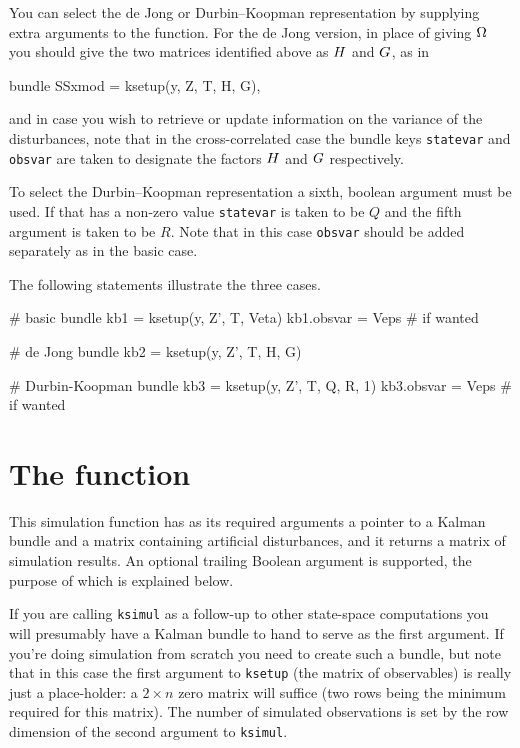 You can select the de Jong or Durbin--Koopman representation by
supplying extra arguments to the  function. For the de
Jong version, in place of giving $\Omega$ you should give the two
matrices identified above as $H$ and $G$, as in
\begin{code}
bundle SSxmod = ksetup(y, Z, T, H, G),
\end{code}
and in case you wish to retrieve or update information on the variance of
the disturbances, note that in the cross-correlated case the bundle
keys \texttt{statevar} and \texttt{obsvar} are taken to designate the
factors $H$ and $G$ respectively.

To select the Durbin--Koopman representation a sixth, boolean
argument must be used. If that has a non-zero value \texttt{statevar}
is taken to be $Q$ and the fifth argument is taken to be $R$. Note
that in this case \texttt{obsvar} should be added separately as in the
basic case.

The following statements illustrate the three cases.

\begin{code}
# basic
bundle kb1 = ksetup(y, Z', T, Veta)
kb1.obsvar = Veps # if wanted

# de Jong
bundle kb2 = ksetup(y, Z', T, H, G)

# Durbin-Koopman
bundle kb3 = ksetup(y, Z', T, Q, R, 1)
kb3.obsvar = Veps # if wanted
\end{code}

\section{The  function}
\label{sec:ksimul}

This simulation function has as its required arguments a pointer to a
Kalman bundle and a matrix containing artificial disturbances, and it
returns a matrix of simulation results. An optional trailing Boolean
argument is supported, the purpose of which is explained below.

If you are calling \texttt{ksimul} as a follow-up to other state-space
computations you will presumably have a Kalman bundle to hand to serve
as the first argument. If you're doing simulation from scratch you
need to create such a bundle, but note that in this case the first
argument to \texttt{ksetup} (the matrix of observables) is really just
a place-holder: a $2 \times n$ zero matrix will suffice (two rows
being the minimum required for this matrix). The number of simulated
observations is set by the row dimension of the second argument to
\texttt{ksimul}.

